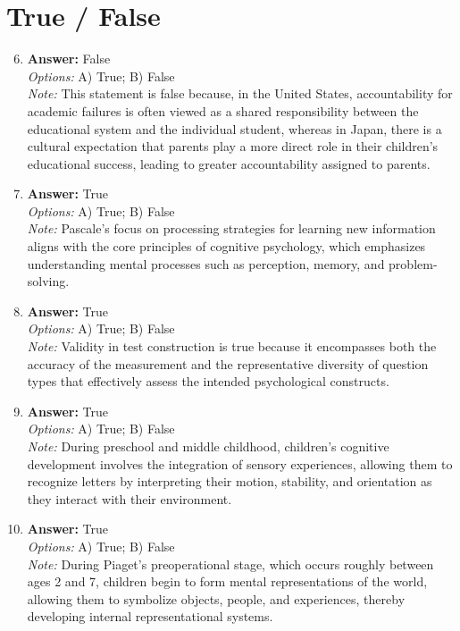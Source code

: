 \documentclass[12pt]{article}
\begin{document}
\section*{True / False}
\begin{enumerate}[label=\arabic*.]
\setcounter{enumi}{5}
\item \textbf{Answer:} False
\\ \textit{Options:} A) True; B) False
\\ \textit{Note:} This statement is false because, in the United States, accountability for academic failures is often viewed as a shared responsibility between the educational system and the individual student, whereas in Japan, there is a cultural expectation that parents play a more direct role in their children's educational success, leading to greater accountability assigned to parents.
\item \textbf{Answer:} True
\\ \textit{Options:} A) True; B) False
\\ \textit{Note:} Pascale's focus on processing strategies for learning new information aligns with the core principles of cognitive psychology, which emphasizes understanding mental processes such as perception, memory, and problem-solving.
\item \textbf{Answer:} True
\\ \textit{Options:} A) True; B) False
\\ \textit{Note:} Validity in test construction is true because it encompasses both the accuracy of the measurement and the representative diversity of question types that effectively assess the intended psychological constructs.
\item \textbf{Answer:} True
\\ \textit{Options:} A) True; B) False
\\ \textit{Note:} During preschool and middle childhood, children's cognitive development involves the integration of sensory experiences, allowing them to recognize letters by interpreting their motion, stability, and orientation as they interact with their environment.
\item \textbf{Answer:} True
\\ \textit{Options:} A) True; B) False
\\ \textit{Note:} During Piaget's preoperational stage, which occurs roughly between ages 2 and 7, children begin to form mental representations of the world, allowing them to symbolize objects, people, and experiences, thereby developing internal representational systems.
\end{enumerate}
\end{document}
